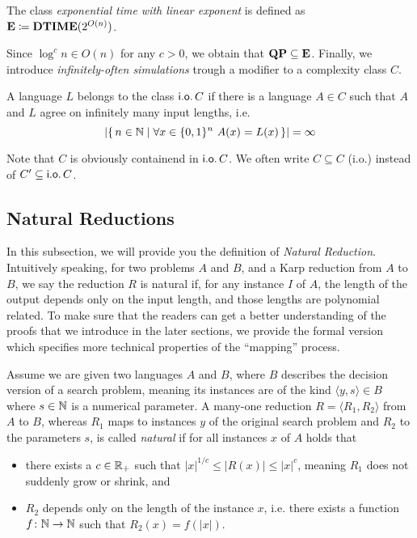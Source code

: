 \documentclass[11pt]{article}
\begin{document}
\begin{definition}
  The class \emph{exponential time with linear exponent} is defined as
	$\mathbf{E} \coloneqq \mathbf{DTIME}(2^{O(n)})$.
\end{definition}
Since $\log^c n \in O(n)$ for any $c > 0$, we obtain that
$\mathbf{QP} \subseteq \mathbf{E}$.
%
Finally, we introduce \emph{infinitely-often simulations} trough a modifier to
a complexity class $C$.
\begin{definition}
  A language $L$ belongs to the class
  $\mathsf{i.o.}\, C$ if there is a language $A \in C$ such that
  $A$ and $L$ agree on infinitely many input lengths, i.e.
  \[
    |\set{ n \in \N \mid \forall x \in \{0,1\}^n\ A(x) = L(x) }| = \infty
  \]
\end{definition}
Note that $C$ is obviously containend in $\mathsf{i.o.}\, C$.
We often write $C \subseteq C$ (i.o.) instead of
$C' \subseteq \mathsf{i.o.}\, C$.



\subsection{Natural Reductions}

In this subsection, we will provide you the definition of \textit{Natural Reduction}. Intuitively speaking, for two problems $A$ and $B$, and a Karp reduction from $A$ to $B$, we say the reduction $R$ is natural if, for any instance $I$ of $A$, the length of the output depends only on the input length, and those lengths are polynomial related. To make sure that the readers can get a better understanding of the proofs that we introduce in the later sections, we provide the formal version which specifies more technical properties of the ``mapping'' process. 

\begin{definition}
  Assume we are given two languages $A$ and $B$, where $B$ describes the
  decision version of a search problem, meaning its instances are of the kind
  $\langle y, s \rangle \in B$ where $s \in {\mathbb{N}}$ is a numerical parameter.
  A many-one reduction $R = \langle R_1, R_2 \rangle$ from $A$ to $B$, whereas
  $R_1$ maps to instances $y$ of the original search problem and $R_2$ to the
  parameters $s$, is called \emph{natural} if for all instances $x$ of $A$ holds
  that
  \begin{itemize}
    \item there exists a $c \in {\mathbb R}_+$ such that
      $|x|^{1/c} \le |R(x)| \le |x|^c$, meaning $R_1$ does not suddenly grow or
      shrink, and
    \item $R_2$ depends only on the length of the instance $x$, i.e. there
      exists a function $f \colon {\mathbb{N}} \to {\mathbb{N}}$ such that $R_2(x) = f(|x|)$.
  \end{itemize}
\end{definition}
	
\end{document}
